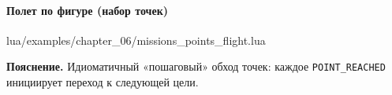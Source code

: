 \paragraph{Полет по фигуре (набор точек)}
\begin{codefile}{lua/examples/chapter_06/missions_points_flight.lua}
\end{codefile}
\textbf{Пояснение.} Идиоматичный «пошаговый» обход точек: каждое \texttt{POINT\_REACHED} инициирует переход к следующей цели.
